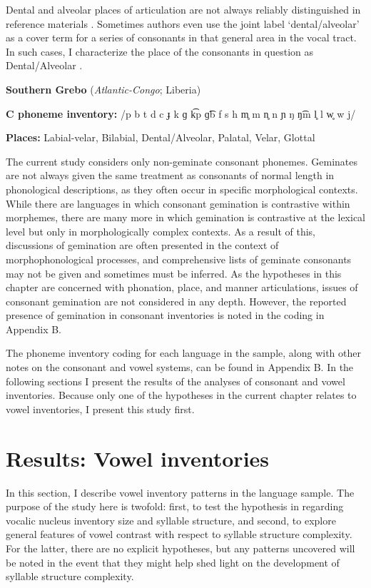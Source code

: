   Dental and alveolar places of articulation are not always reliably distinguished in reference materials \citep[31-32]{Maddieson1984}. Sometimes authors even use the joint label ‘dental/alveolar’ as a cover term for a series of consonants in that general area in the vocal tract. In such cases, I characterize the place of the consonants in question as Dental/Alveolar .

\ea\label{ex:4.11}
  \textbf{Southern Grebo} (\textit{Atlantic-Congo}; Liberia)

\textbf{C phoneme inventory:} /p b t d c ɟ k ɡ k͡p ɡ͡b f s h m̥ m n̥ n ɲ ŋ ŋ͡m l̥ l w̥ w j/

\textbf{Places:} Labial-velar, Bilabial, Dental/Alveolar, Palatal, Velar, Glottal
\z

  The current study considers only non-geminate consonant phonemes. Geminates are not always given the same treatment as consonants of normal length in phonological descriptions, as they often occur in specific morphological contexts. While there are languages in which consonant gemination is contrastive within morphemes, there are many more in which gemination is contrastive at the lexical level but only in morphologically complex contexts. As a result of this, discussions of gemination are often presented in the context of morphophonological processes, and comprehensive lists of geminate consonants may not be given and sometimes must be inferred. As the hypotheses in this chapter are concerned with phonation, place, and manner articulations, issues of consonant gemination are not considered in any depth. However, the reported presence of gemination in consonant inventories is noted in the coding in Appendix B.

  The phoneme inventory coding for each language in the sample, along with other notes on the consonant and vowel systems, can be found in Appendix B. In the following sections I present the results of the analyses of consonant and vowel inventories. Because only one of the hypotheses in the current chapter relates to vowel inventories, I present this study first.

\section{Results: Vowel inventories}\label{sec:4.3}

  In this section, I describe vowel inventory patterns in the language sample. The purpose of the study here is twofold: first, to test the hypothesis in  regarding vocalic nucleus inventory size and syllable structure, and second, to explore general features of vowel contrast with respect to syllable structure complexity. For the latter, there are no explicit hypotheses, but any patterns uncovered will be noted in the event that they might help shed light on the development of syllable structure complexity.

